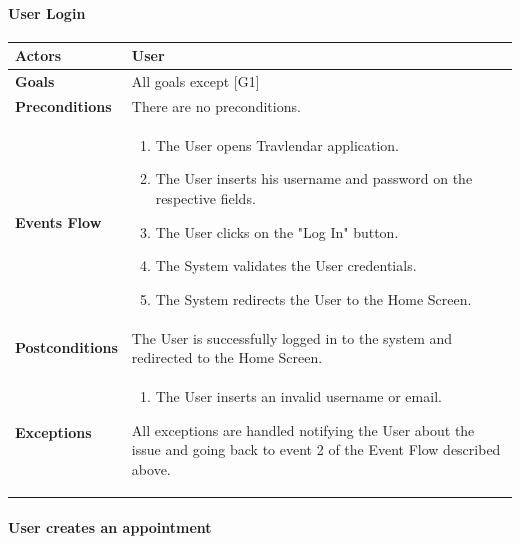 \documentclass[12pt]{article}
\begin{document}
\newpage

\paragraph{User Login}
\begin{center}
    \begin{tabular} { |p{}|p{}| }
        \hline
        \textbf{Actors} & User \\ 
        \hline
        \textbf{Goals} & All goals except {[G1]} \\ 
        \hline  
        \textbf{Preconditions} & There are no preconditions. \\ 
        \hline
        \textbf{Events Flow} & \begin{enumerate}[topsep=0pt] 
                            \setlength{\itemsep}{0.5pt}
                            \item The User opens Travlendar application.
                            \item The User inserts his username and password on the respective fields.
                            \item The User clicks on the "Log In" button.
                            \item The System validates the User credentials.
                            \item The System redirects the User to the Home Screen.
                            \end{enumerate} \\
        \hline
        \textbf{Postconditions} & The User is successfully logged in to the system and redirected to the Home Screen. \\
        \hline
        \textbf{Exceptions} & \begin{enumerate}[topsep=0pt] 
                            \setlength{\itemsep}{0.5pt}
                            \item The User inserts an invalid username or email.
                            \end{enumerate} 
                            All exceptions are handled notifying the User about the issue and going back to event 2 of the Event Flow described above.\\ 
        \hline
    \end{tabular}
\end{center}

\newpage

\paragraph{User creates an appointment}
\end{document}
